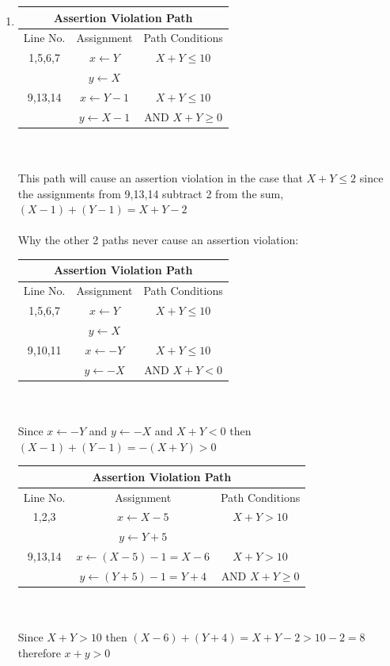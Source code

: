 \documentclass[a4paper,12pt]{article}
\begin{document}
\begin{enumerate}
\begin{enumerate}
				\item 	\begin{tabular}{|c|c|c|}
					\hline
					\multicolumn{3}{|c|}{Assertion Violation Path} \\
					\hline
					Line No. & Assignment & Path Conditions \\
					\hline
					1,5,6,7   & $x\leftarrow Y$ & $X+Y \le
					 10$ \\
					~ & $y\leftarrow X$ & ~   \\
					\hline
					9,13,14  & $x\leftarrow Y-1$ & $X+Y \le 10$ \\
					~ & $y\leftarrow X-1$ & AND $ X + Y \ge 0$   \\
					\hline
				\end{tabular} ~\\\\
			This path will cause an assertion violation in the case that $X+Y \le 2$ since the assignments from 9,13,14 subtract 2 from the sum, $(X-1) + (Y-1) = X + Y - 2$\\\\
			
			Why the other 2 paths never cause an assertion violation:\\
			\begin{tabular}{|c|c|c|}
				\hline
				\multicolumn{3}{|c|}{Assertion Violation Path} \\
				\hline
				Line No. & Assignment & Path Conditions \\
				\hline
				1,5,6,7   & $x\leftarrow Y$ & $X+Y \le
				10$ \\
				~ & $y\leftarrow X$ & ~   \\
				\hline
				9,10,11  & $x\leftarrow -Y$ & $X+Y \le 10$ \\
				~ & $y\leftarrow -X$ & AND $ X + Y < 0$   \\
				\hline
			\end{tabular} ~\\\\
			Since  $x\leftarrow -Y$ and $y\leftarrow -X$ and $X+Y<0$ then $(X-1) + (Y-1) = -(X+Y) > 0$
		
			\begin{tabular}{|c|c|c|}
				\hline
				\multicolumn{3}{|c|}{Assertion Violation Path} \\
				\hline
				Line No. & Assignment & Path Conditions \\
				\hline
				1,2,3   & $x\leftarrow X-5$ & $X+Y >
				10$ \\
				~ & $y\leftarrow Y+5$ & ~   \\
				\hline
				9,13,14  & $x\leftarrow (X-5)-1=X-6$ & $X+Y > 10$ \\
				~ & $y\leftarrow (Y+5)-1=Y+4$ & AND $ X + Y \ge 0$   \\
				\hline
			\end{tabular} ~\\\\
			Since $X+Y>10$ then $(X-6) + (Y+4) = X+Y-2 > 10-2 = 8$ therefore $x+y > 0$
		

\end{enumerate}
\end{enumerate}
\end{document}
